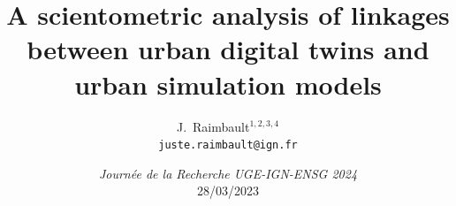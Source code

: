 \documentclass[english,11pt]{beamer}
\begin{document}
\title{A scientometric analysis of linkages between urban digital twins and urban simulation models}

\author{J.~Raimbault$^{1,2,3,4}$\\
\texttt{juste.raimbault@ign.fr}
}




\date{\textit{Journ{\'e}e de la Recherche UGE-IGN-ENSG 2024}\\
28/03/2023
}







\end{document}
